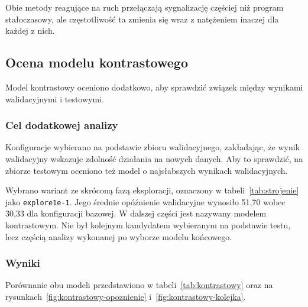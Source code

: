Obie metody reagujące na ruch przełączają sygnalizację częściej niż program stałoczasowy, ale częstotliwość ta zmienia się wraz z natężeniem inaczej dla każdej z nich.

\subsection{Ocena modelu kontrastowego}
\label{subsec:model-kontrastowy}

Model kontrastowy oceniono dodatkowo, aby sprawdzić związek między wynikami walidacyjnymi i testowymi.

\subsubsection{Cel dodatkowej analizy}
\label{subsubsec:cel-kontrastowy}

Konfiguracje wybierano na podstawie zbioru walidacyjnego, zakładając, że wynik walidacyjny wskazuje zdolność działania na nowych danych. Aby to sprawdzić, na zbiorze testowym oceniono też model o najsłabszych wynikach walidacyjnych.

Wybrano wariant ze skróconą fazą eksploracji, oznaczony w tabeli~\ref{tab:strojenie} jako \texttt{explore1e-1}. Jego średnie opóźnienie walidacyjne wynosiło 51,70 wobec 30,33 dla konfiguracji bazowej. W dalszej części jest nazywany modelem kontrastowym. Nie był kolejnym kandydatem wybieranym na podstawie testu, lecz częścią analizy wykonanej po wyborze modelu końcowego.

\subsubsection{Wyniki}
\label{subsubsec:wyniki-kontrastowy}

Porównanie obu modeli przedstawiono w tabeli~\ref{tab:kontrastowy} oraz na rysunkach~\ref{fig:kontrastowy-opoznienie} i~\ref{fig:kontrastowy-kolejka}.

